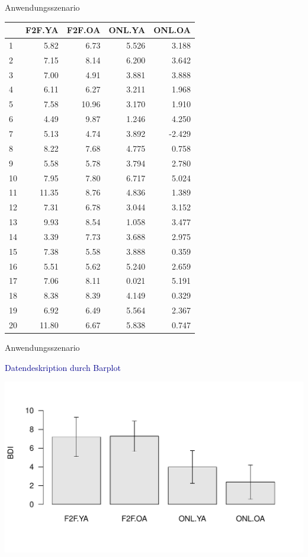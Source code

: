 \documentclass[
  8pt,
  ignorenonframetext,
]{beamer}
\begin{document}
\begin{frame}[fragile]{Anwendungsszenario}
\begin{longtable}[]{@{}lrrrr@{}}
\toprule
& F2F.YA & F2F.OA & ONL.YA & ONL.OA \\
\midrule
\endhead
1 & 5.82 & 6.73 & 5.526 & 3.188 \\
2 & 7.15 & 8.14 & 6.200 & 3.642 \\
3 & 7.00 & 4.91 & 3.881 & 3.888 \\
4 & 6.11 & 6.27 & 3.211 & 1.968 \\
5 & 7.58 & 10.96 & 3.170 & 1.910 \\
6 & 4.49 & 9.87 & 1.246 & 4.250 \\
7 & 5.13 & 4.74 & 3.892 & -2.429 \\
8 & 8.22 & 7.68 & 4.775 & 0.758 \\
9 & 5.58 & 5.78 & 3.794 & 2.780 \\
10 & 7.95 & 7.80 & 6.717 & 5.024 \\
11 & 11.35 & 8.76 & 4.836 & 1.389 \\
12 & 7.31 & 6.78 & 3.044 & 3.152 \\
13 & 9.93 & 8.54 & 1.058 & 3.477 \\
14 & 3.39 & 7.73 & 3.688 & 2.975 \\
15 & 7.38 & 5.58 & 3.888 & 0.359 \\
16 & 5.51 & 5.62 & 5.240 & 2.659 \\
17 & 7.06 & 8.11 & 0.021 & 5.191 \\
18 & 8.38 & 8.39 & 4.149 & 0.329 \\
19 & 6.92 & 6.49 & 5.564 & 2.367 \\
20 & 11.80 & 6.67 & 5.838 & 0.747 \\
\bottomrule
\end{longtable}
\end{frame}

\begin{frame}{Anwendungsszenario}
\protect\hypertarget{anwendungsszenario-11}{}
\vspace{1mm}

\textcolor{darkblue}{Datendeskription durch Barplot}

\vspace{3mm}
\center

\begin{center}\includegraphics[width=0.95\linewidth]{11_Abbildungen/alm_11_zva_barplot_beispiel} \end{center}
\end{frame}
\end{document}

